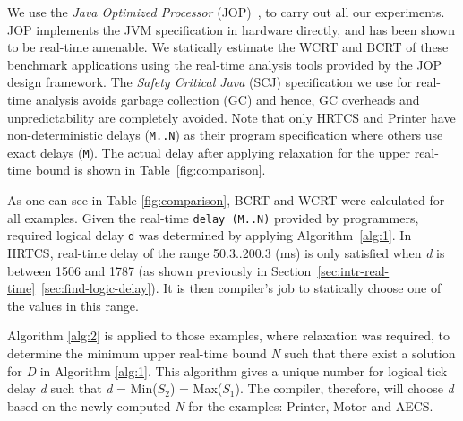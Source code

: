 
We use the \textit{Java Optimized Processor}
(JOP)~\cite{jop:jnl:jsa2007}, to carry out all our experiments. JOP
implements the JVM specification in hardware directly, and has been
shown to be real-time amenable. We statically estimate the WCRT and BCRT
of these benchmark applications using the real-time analysis tools
provided by the JOP design framework. The \textit{Safety Critical Java}
(SCJ) specification we use for real-time analysis avoids garbage
collection (GC) and hence, GC overheads and unpredictability are
completely avoided. Note that only HRTCS and Printer have
non-deterministic delays (\texttt{M..N}) as their program specification
where others use exact delays (\texttt{M}). The actual delay after
applying relaxation for the upper real-time bound is shown in
Table~\ref{fig:comparison}.


As one can see in Table \ref{fig:comparison}, BCRT and WCRT were
calculated for all examples. Given the real-time \mbox{\texttt{delay
(M..N)}} provided by programmers, required logical delay \texttt{d} was
determined by applying Algorithm~\ref{alg:1}. In HRTCS, real-time delay
of the range 50.3..200.3 (ms) is only satisfied when \emph{d} is between
1506 and 1787 (as shown previously in
Section~\ref{sec:intr-real-time}~\ref{sec:find-logic-delay}).  It is
then compiler's job to statically choose one of the values in this
range.

Algorithm \ref{alg:2} is applied to those examples, where relaxation was
required, to determine the minimum upper real-time bound \emph{N} such
that there exist a solution for \emph{D} in Algorithm \ref{alg:1}. This
algorithm gives a unique number for logical tick delay \emph{d} such
that \emph{d} = Min(\emph{$S_2$}) = Max(\emph{$S_1$}).  The compiler,
therefore, will choose \emph{d} based on the newly computed \emph{N} for
the examples: Printer, Motor and AECS.



